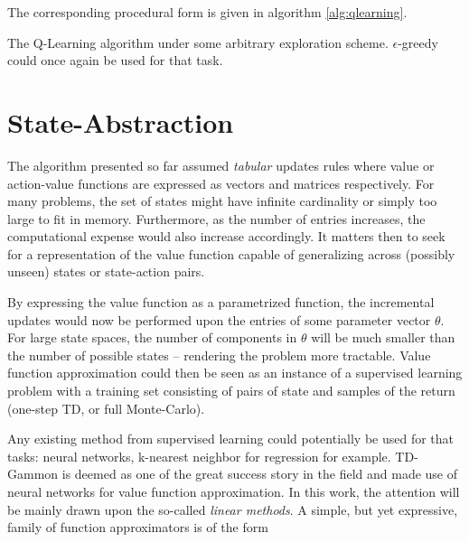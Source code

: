 \documentclass[12pt, oneside, extrafontsizes]{memoir}  %
\theoremstyle{plain}
\theoremstyle{definition}
\begin{document}
The corresponding procedural form is given in algorithm \ref{alg:qlearning}.

\begin{algorithm}
\DontPrintSemicolon
{}
\caption{The Q-Learning algorithm under some arbitrary exploration scheme.
$\epsilon$-greedy could once again be used for that task.}
\label{alg:qlearning}
\end{algorithm}

\section{State-Abstraction}
The algorithm presented so far assumed \textit{tabular} updates rules where value or
action-value functions are expressed as vectors and matrices respectively. For many
problems, the set of states might have infinite cardinality or simply too large to fit in
memory. Furthermore, as the number of entries increases, the computational expense
would also increase accordingly. It matters then to seek for a representation of the
value function capable of generalizing across (possibly unseen) states or state-action
pairs.

By expressing the value function as a parametrized function, the incremental updates
would now be performed upon the entries of some parameter vector $\theta$. For
large state spaces, the number of components in $\theta$ will be much smaller than
the number of possible states -- rendering the problem more tractable. Value function
approximation could then be seen as an instance of a supervised learning problem
with a training set consisting of pairs of state and samples of the return (one-step TD,
or full Monte-Carlo).

Any existing method from supervised learning could potentially be used for that tasks:
neural networks, k-nearest neighbor for regression for example. TD-Gammon
\cite{Tesauro1995} is deemed as one of the great success story in the field and made 
use of neural networks for value function approximation. In this work, the attention
will be mainly drawn upon the so-called \textit{linear methods}. A simple, but yet
expressive, family of function approximators is of the form
\end{document}
